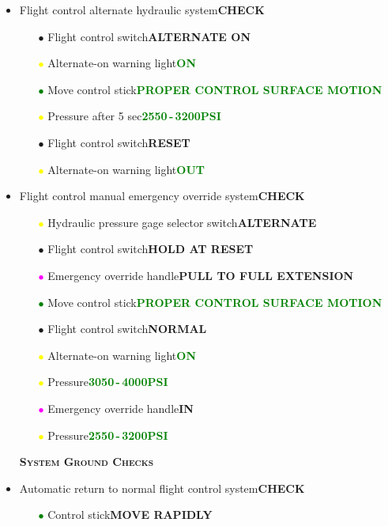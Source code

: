 \documentclass[a4paper,12pt,dvipsnames]{letter}
\newcommand{\button}[1]{\textbf{#1}}
\newcommand{\ok}[1]{\textcolor{Green}{\textbf{#1}}}
\newcommand{\myHead}[1]{{\LARGE\textsc{\textbf{#1}}}}
\newcommand{\gi}{\textcolor{Green}{$\bullet$\;}}
\newcommand{\yi}{\textcolor{Yellow}{$\bullet$\;}}
\newcommand{\mi}{\textcolor{Magenta}{$\bullet$\;}}
\newcommand{\ai}{\textcolor{Apricot}{$\bullet$\;}}
\begin{document}
{\begin{itemize}
\begin{itemize}
\end{itemize}
\item Flight control alternate hydraulic system\dotfill\button{CHECK}
\begin{itemize}
 \item[\ai] Flight control switch\dotfill\button{ALTERNATE ON}
 \item[\yi] Alternate-on warning light\dotfill\ok{ON}
 \item[\gi] Move control stick\dotfill\ok{PROPER CONTROL SURFACE MOTION}
 \item[\yi] Pressure after 5 sec\dotfill\ok{2550\,-\,3200\;PSI}
 \item[\ai] Flight control switch\dotfill\button{RESET}
 \item[\yi] Alternate-on warning light\dotfill\ok{OUT}
\end{itemize}
\item Flight control manual emergency override system\dotfill\button{CHECK}
\begin{itemize}
  \item[\yi] Hydraulic pressure gage selector switch\dotfill\button{ALTERNATE}
  \item[\ai] Flight control switch\dotfill\button{HOLD AT RESET}
  \item[\mi] Emergency override handle\dotfill\button{PULL TO FULL EXTENSION}
  \item[\gi] Move control stick\dotfill\ok{PROPER CONTROL SURFACE MOTION}
  \item[\ai] Flight control switch\dotfill\button{NORMAL}
  \item[\yi] Alternate-on warning light\dotfill\ok{ON}
  \item[\yi] Pressure\dotfill\ok{3050\,-\,4000\;PSI}  
  \item[\mi] Emergency override handle\dotfill\button{IN}
  \item[\yi] Pressure\dotfill\ok{2550\,-\,3200\;PSI}
\end{itemize}
\end{itemize}
\newpage
\begin{itemize}
\item[] \myHead{System Ground Checks}
\item Automatic return to normal flight control system\dotfill\button{CHECK}
\begin{itemize}
  \item[\gi] Control stick\dotfill\button{MOVE RAPIDLY}

\end{itemize}
\end{itemize}}
\end{document}
